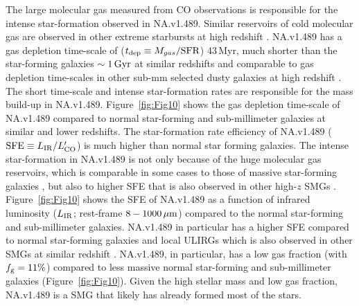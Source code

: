 \documentclass[iop,apj,useAMS,usenatbib]{emulateapj-rtx4}
\begin{document}
The large molecular gas measured from CO observations is responsible
for the intense star-formation observed in NA.v1.489. Similar
reservoirs of cold molecular gas are observed in other extreme
starbursts at high redshift \citep{Riechers2011, Riechers2013, Fu2013,
Spilker2015}. NA.v1.489 has a gas depletion
time-scale of ($t_{\rm dep}\equiv M_{gas}/{\rm SFR}$) 43\,Myr, much
shorter than the star-forming galaxies $\rm \sim1\,Gyr$ at similar
redshifts \citep{Genzel2010, Decarli2016a, Decarli2016b} and
  comparable to gas depletion time-scales in other sub-mm selected
  dusty galaxies at high redshift \citep{Riechers2010, Riechers2013}. The short time-scale
and intense star-formation rates are responsible for the mass build-up
in NA.v1.489. Figure~\ref{fig:Fig10} shows the gas depletion
time-scale of NA.v1.489 compared to normal star-forming and
sub-millimeter galaxies at similar and lower redshifts. The star-formation rate
efficiency of NA.v1.489 (${\rm SFE}\equiv L_{\rm IR}/L_{\rm
  CO}^{\prime}$) is much higher than normal star forming galaxies. The
intense star-formation in NA.v1.489 is not only because of the huge
molecular gas reservoirs, which is comparable in some cases to those
of massive star-forming galaxies \citep{Genzel2010, Tacconi2013,
  Genzel2015}, but also to higher SFE that is also observed in other
high-$z$ SMGs \citep{Fu2013}. Figure~\ref{fig:Fig10} shows the SFE of
NA.v1.489 as a function of infrared luminosity ($ L_{\rm IR}$;
rest-frame $\rm 8-1000\,\mu m$) compared to the normal star-forming
and sub-millimeter galaxies. NA.v1.489 in particular has a higher SFE
compared to normal star-forming galaxies and local ULIRGs which is
also observed in other SMGs at similar redshift
\citep{Fu2012}. NA.v1.489, in particular, has a low gas fraction (with
$f_{\rm g}=11\%$) compared to less massive normal star-forming and
sub-millimeter galaxies (Figure~\ref{fig:Fig10}). Given the
high stellar mass and low gas fraction, NA.v1.489 is a SMG that
likely has already formed most of the stars.  
\end{document}
